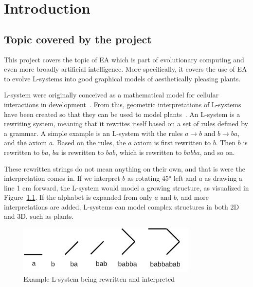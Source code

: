 \chapter{Introduction}
\label{chap:introduction}

\section{Topic covered by the project}
\label{sec:topic}

This project covers the topic of \gls{EA} which is part of evolutionary computing and even more broadly artificial intelligence.
More specifically, it covers the use of \gls{EA} to evolve \glspl{L-system} into good graphical models of aesthetically pleasing plants.

L-system were originally conceived as a mathematical model for cellular interactions in development~\cite{1968Lindenmayer-1,1968Lindenmayer-2}.
From this, geometric interpretations of L-systems have been created so that they can be used to model plants~\cite{2012Prusinkiewicz}.
An L-system is a rewriting system, meaning that it rewrites itself based on a set of rules defined by a grammar.
A simple example is an L-system with the rules $a \rightarrow b$ and $b \rightarrow ba$, and the axiom $a$.
Based on the rules, the $a$ axiom is first rewritten to $b$.
Then $b$ is rewritten to $ba$, $ba$ is rewritten to $bab$, which is rewritten to $babba$, and so on.

These rewritten strings do not mean anything on their own, and that is were the interpretation comes in.
If we interpret $b$ as rotating 45° left and $a$ as drawing a line 1 cm forward, the L-system would model a growing structure, as visualized in Figure~\ref{fig:example-l}.
If the alphabet is expanded from only $a$ and $b$, and more interpretations are added, L-systems can model complex structures in both 2D and 3D, such as plants.

\begin{figure}
    \centering
    \includegraphics[width=0.8\textwidth]{figures/lsystem}
    \caption{Example L-system being rewritten and interpreted}
    \label{fig:example-l}
\end{figure}

